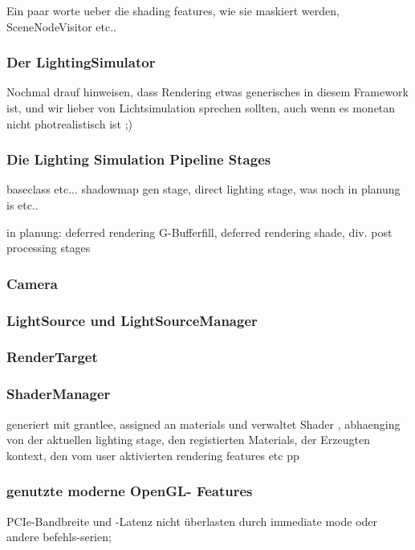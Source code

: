 
\label{sec:visualDomain}
	
Ein paar worte ueber die shading features, wie sie maskiert werden, SceneNodeVisitor etc..

\subsubsection{Der LightingSimulator}
	Nochmal drauf hinweisen, dass Rendering etwas generisches in diesem Framework ist, und wir lieber von Lichtsimulation sprechen sollten, auch wenn es monetan nicht photrealistisch ist ;)

\subsubsection{Die Lighting Simulation Pipeline Stages}
	baseclass etc...
	shadowmap gen stage, direct lighting stage, was noch in planung is etc..

	in planung: deferred rendering G-Bufferfill, deferred rendering shade, div. post processing stages
	
\subsubsection{Camera}


\subsubsection{LightSource und LightSourceManager}
	
	
\subsubsection{RenderTarget}	
	

\subsubsection{ShaderManager}
	generiert mit grantlee, assigned an materials und verwaltet Shader , abhaenging von der aktuellen lighting stage, den registierten Materials,
	der Erzeugten kontext, den vom user aktivierten rendering features etc pp

\subsubsection{genutzte moderne OpenGL- Features}	
	\label{sec:usedOpenGLfeatures}

	PCIe-Bandbreite und -Latenz nicht überlasten durch immediate mode oder andere befehls-serien;

